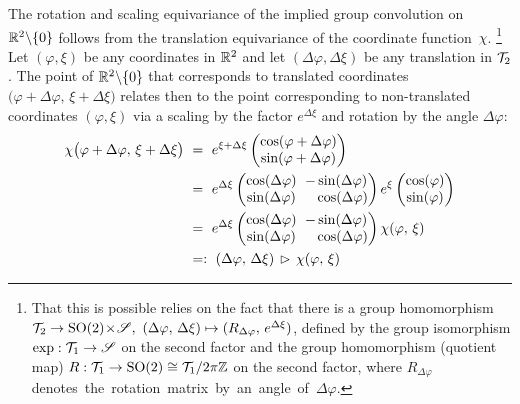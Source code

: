 The rotation and scaling equivariance of the implied group convolution on $\mathbb{R}^2 \backslash \{0\}$ follows from the translation equivariance of the coordinate function~$\chi$.%
\footnote{
    That this is possible relies on the fact that there is a group homomorphism
    $\mathcal{T}_2 \to \operatorname{SO}(2) \!\times\! \mathscr{S},\ (\Delta\varphi,\, \Delta\xi) \mapsto (R_{\Delta\varphi},\, e^{\Delta\xi})$,
    defined by the group isomorphism $\exp: \mathcal{T}_1 \to \mathscr{S}$ on the second factor and the group homomorphism (quotient map) $R: \mathcal{T}_1 \to \operatorname{SO}(2) \cong \mathcal{T}_1 / 2\pi\mathbb{Z}$ on the second factor, where $R_{\Delta\varphi}$
    \mbox{denotes the rotation matrix by an angle of $\Delta\varphi$.}
}
Let $(\varphi, \xi)$ be any coordinates in $\mathbb{R}^2$ and let $(\Delta\varphi, \Delta\xi)$ be any translation in $\mathcal{T}_2$.
The point of $\mathbb{R}^2 \backslash \{0\}$ that corresponds to translated coordinates ${(\varphi \!+\! \Delta\varphi} ,\, {\xi \!+\! \Delta\xi)}$ relates then to the point corresponding to non-translated coordinates $(\varphi, \xi)$ via a scaling by the factor $e^{\Delta\xi}$ and rotation by the angle $\Delta\varphi$:
\begin{align}\label{eq:log_polar_translation_equivariance}
    \chi \big( \varphi+\Delta\varphi ,\, \xi+\Delta\xi \big)
    \ &=\ e^{\xi+\Delta\xi} \begin{pmatrix} \cos(\varphi+\Delta\varphi) \\ \sin(\varphi+\Delta\varphi) \end{pmatrix} \notag \\
    \ &=\ e^{\Delta\xi}
        \begin{pmatrix} \cos(\Delta\varphi)\mkern-8mu & -\sin(\Delta\varphi) \\ \sin(\Delta\varphi)\mkern-8mu & \phantom{-} \cos(\Delta\varphi) \end{pmatrix}
        e^\xi \begin{pmatrix} \cos(\varphi) \\ \sin(\varphi) \end{pmatrix} \notag \\
    \ &=\ e^{\Delta\xi}
        \begin{pmatrix} \cos(\Delta\varphi)\mkern-8mu & -\sin(\Delta\varphi) \\ \sin(\Delta\varphi)\mkern-8mu & \phantom{-} \cos(\Delta\varphi) \end{pmatrix}
        \chi(\varphi,\, \xi) \notag \\
    \ &=:\ (\Delta\varphi,\, \Delta\xi) \,\rhd\, \chi(\varphi,\, \xi)
\end{align}

